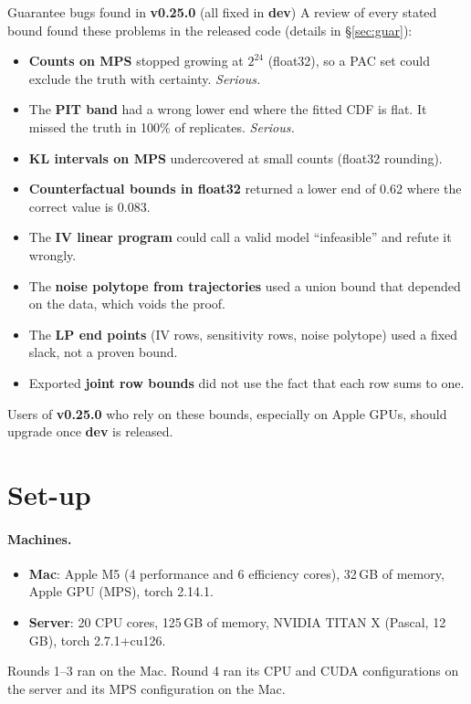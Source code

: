 \documentclass[10pt,a4paper]{article}
\newcommand{\old}{\textbf{v0.25.0}}
\newcommand{\new}{\textbf{dev}}
\begin{document}
\begin{warnbox}{Guarantee bugs found in \old{} (all fixed in \new)}
A review of every stated bound found these problems in the released code (details in §\ref{sec:guar}):
\begin{itemize}
\item \textbf{Counts on MPS} stopped growing at $2^{24}$ (float32), so a PAC set could exclude the truth with certainty. \emph{Serious.}
\item The \textbf{PIT band} had a wrong lower end where the fitted CDF is flat. It missed the truth in 100\% of replicates. \emph{Serious.}
\item \textbf{KL intervals on MPS} undercovered at small counts (float32 rounding).
\item \textbf{Counterfactual bounds in float32} returned a lower end of 0.62 where the correct value is 0.083.
\item The \textbf{IV linear program} could call a valid model ``infeasible'' and refute it wrongly.
\item The \textbf{noise polytope from trajectories} used a union bound that depended on the data, which voids the proof.
\item The \textbf{LP end points} (IV rows, sensitivity rows, noise polytope) used a fixed slack, not a proven bound.
\item Exported \textbf{joint row bounds} did not use the fact that each row sums to one.
\end{itemize}
Users of \old{} who rely on these bounds, especially on Apple GPUs, should upgrade once \new{} is released.
\end{warnbox}

\section{Set-up}

\paragraph{Machines.}
\begin{itemize}
\item \textbf{Mac}: Apple M5 (4 performance and 6 efficiency cores), 32\,GB of memory, Apple GPU (MPS), torch 2.14.1.
\item \textbf{Server}: 20 CPU cores, 125\,GB of memory, NVIDIA TITAN X (Pascal, 12\,GB), torch 2.7.1+cu126.
\end{itemize}
Rounds 1--3 ran on the Mac. Round 4 ran its CPU and CUDA configurations on the server and its MPS configuration on the Mac.
\end{document}
